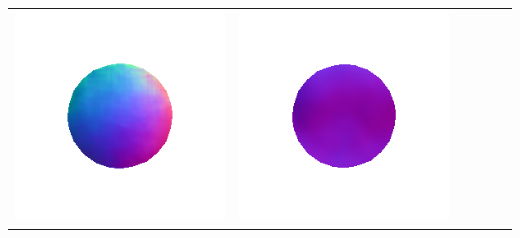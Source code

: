 \begin{tabularx}{\linewidth}{@{}Y@{}Y@{}Y@{}Y@{}Y@{}Y@{}}
\includegraphics[width=\linewidth]{semisynthetic/20160617_1_marrnet_out.png} &
\includegraphics[width=\linewidth]{semisynthetic/20160617_1_ef_out.png} \\

\end{tabularx}
